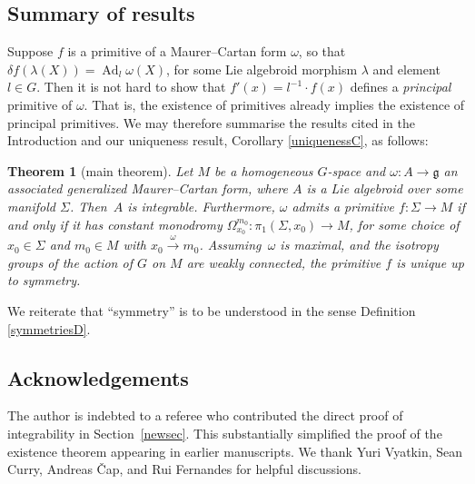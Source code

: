 \documentclass[10pt,a4paper]{amsart}
\numberwithin{equation}{section}
\newtheorem{Theorem}{Theorem}[section]
\DeclareMathOperator{\Adjoint}{Ad}
\begin{document}
\subsection*{Summary of results}

Suppose $f$ is a primitive of a Maurer--Cartan form $\omega $, so that
$\delta f (\lambda(X))=\Adjoint_l \omega(X)$, for some Lie algebroid
morphism $\lambda $ and element $l \in G$. Then it is not hard to show
that $f'(x)=l^{-1} \cdot f(x)$ defines a {\em principal} primitive of
$\omega $. That is, the existence of primitives already implies the
existence of principal primitives. We may therefore summarise the
results cited in the Introduction and our uniqueness result, Corollary
\ref{uniquenessC}, as follows:


\begin{Theorem}[main theorem]\label{summaryT}
 Let $M$ be a homogeneous $G$-space and
 $\omega \colon A \rightarrow {\mathfrak g} $ an associated
 generalized Maurer--Cartan form, where $A$ is a Lie algebroid over
 some manifold $\Sigma $. Then~$A$ is integrable. Furthermore,
 $\omega $ admits a primitive $f \colon \Sigma \rightarrow M$ if and
 only if it has constant monodromy
 $\Omega_{x_0}^{m_0} \colon \pi_1(\Sigma, x_0) \rightarrow M$, for
 some choice of $x_0 \in \Sigma $ and $m_0 \in M$ with
 $x_0\xrightarrow{\omega}m_0$. Assu\-ming~$\omega $ is maximal, and the isotropy groups of the action of $G$ on $M$ are weakly
 connected, the primitive $f$ is unique up to symmetry.
\end{Theorem}


We reiterate that ``symmetry'' is to be understood in the sense Definition \ref{symmetriesD}.

\subsection*{Acknowledgements} The author is indebted to a referee who
contributed the direct proof of integrability in Section~\ref{newsec}. This substantially simplified the proof of the existence
theorem appearing in earlier manuscripts. We thank Yuri Vyatkin, Sean
Curry, Andreas \v{C}ap, and Rui Fernandes for helpful discussions.

\end{document}
